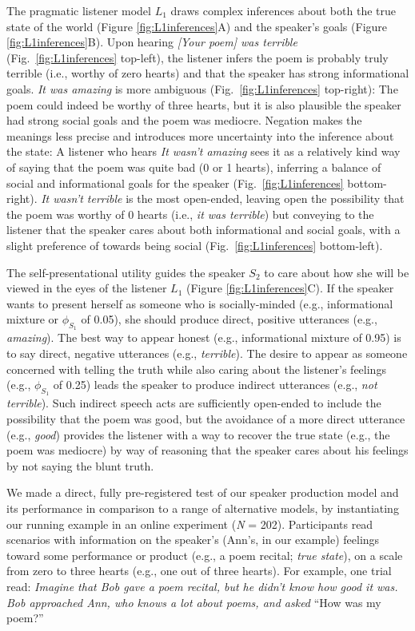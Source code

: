 \documentclass[9pt,twocolumn,twoside,lineno]{main_class_file}
\begin{document}
The pragmatic listener model \(L_1\) draws complex inferences about both the true state of the world (Figure \ref{fig:L1inferences}A) and the speaker's goals (Figure \ref{fig:L1inferences}B).
Upon hearing \emph{{[}Your poem{]} was terrible} (Fig.~\ref{fig:L1inferences} top-left), the listener infers the poem is probably truly terrible (i.e., worthy of zero hearts) and that the speaker has strong informational goals.
\emph{It was amazing} is more ambiguous (Fig.~\ref{fig:L1inferences} top-right): The poem could indeed be worthy of three hearts, but it is also plausible the speaker had strong social goals and the poem was mediocre. 
Negation makes the meanings less precise and introduces more uncertainty into the inference about the state: A listener who hears \emph{It wasn't amazing} sees it as a relatively kind way of saying that the poem was quite bad (0 or 1 hearts), inferring a balance of social and informational goals for the speaker (Fig.~\ref{fig:L1inferences} bottom-right).
\emph{It wasn't terrible} is the most open-ended, leaving open the possibility that the poem was worthy of 0 hearts (i.e., \emph{it was terrible}) but conveying to the listener that the speaker cares about both informational and social goals, with a slight preference of towards being social (Fig.~\ref{fig:L1inferences} bottom-left). 

The self-presentational utility guides the speaker \(S_2\) to care about how she will be viewed in the eyes of the listener \(L_1\) (Figure \ref{fig:L1inferences}C).
If the speaker wants to present herself as someone who is socially-minded (e.g., informational mixture or $\phi_{S_1}$ of 0.05), she should produce direct, positive utterances (e.g., \emph{amazing}).
The best way to appear honest (e.g., informational mixture of 0.95) is to say direct, negative utterances (e.g., \emph{terrible}).
The desire to appear as someone concerned with telling the truth while also caring about the listener's feelings (e.g., $\phi_{S_1}$ of 0.25) leads the speaker to produce indirect utterances (e.g., \emph{not terrible}).
Such indirect speech acts are sufficiently open-ended to include the
possibility that the poem was good, but the avoidance of a more direct utterance (e.g., \emph{good}) provides the listener with a way to recover the true state (e.g., the poem was mediocre) by way of reasoning that the speaker cares about his feelings by not saying the blunt truth.

We made a direct, fully pre-registered test of our speaker production model and its performance in comparison to a range of alternative models, by instantiating our running example in an online experiment (\emph{N} = 202).
Participants read scenarios with information on the speaker's (Ann's,
in our example) feelings toward some performance or product (e.g., a poem
recital; \emph{true state}), on a scale from zero to three hearts (e.g.,
one out of three hearts). For example, one trial read: \emph{Imagine
that Bob gave a poem recital, but he didn't know how good it was. Bob
approached Ann, who knows a lot about poems, and asked} ``How was my poem?''
\end{document}
